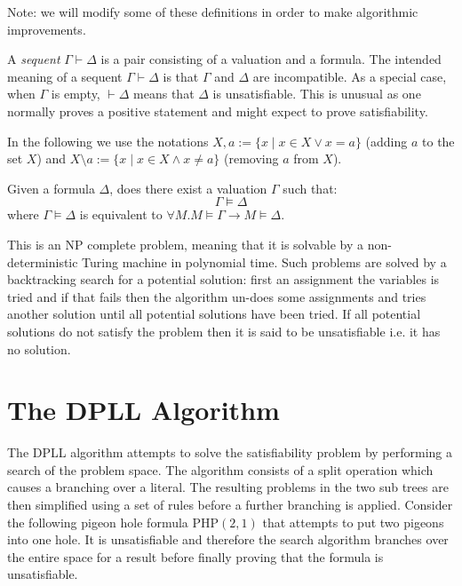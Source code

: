 \begin{mydef}[Preliminaries]
Note: we will modify some of these definitions in order to make algorithmic improvements.
\end{mydef}

%
A \emph{sequent} $\Gamma \vdash \Delta$ is a pair consisting of a valuation and a formula.
%
The intended meaning of a sequent $\Gamma \vdash \Delta$ is that $\Gamma$ and $\Delta$
are incompatible. As a special case, when $\Gamma$ is empty, $\vdash \Delta$ means that $\Delta$ is unsatisfiable. This is unusual as one normally proves a positive statement and might expect to prove satisfiability.
\begin{comment}
\begin{defi}
We define an equivalence relation $\sim$ over the formulae $\Delta_1$ and $\Delta_2$ as follows
$$\Delta_1 \sim \Delta_2 \leftrightarrow \forall C .( C \in \Delta_1 \leftrightarrow C \in \Delta_2) $$
\end{defi}
\end{comment}
%
In the following we use the notations $X,a := \{x \mid x\in X \lor x = a\}$ 
(adding $a$ to the set $X$) and 
$X\setminus a := \{x \mid x\in X \land x \neq a\}$ (removing $a$ from $X$).
%
\medskip
\begin{mydef}
Given a formula $\Delta$, does there exist a valuation $\Gamma$ such that:
$$\Gamma \models \Delta$$
where $\Gamma \models \Delta$ is equivalent to $\forall M. M \models \Gamma \to M \models \Delta$.
\end{mydef}
This is an NP complete problem, meaning that it is solvable by a non-deterministic Turing machine in polynomial time. Such problems are solved by a backtracking search for a potential solution: first an  assignment the variables is tried and if that fails then the algorithm un-does some assignments and tries another solution until all potential solutions have been tried. If all potential solutions do not satisfy the problem then it is said to be unsatisfiable i.e. it has no solution.
\section{The DPLL Algorithm}
The DPLL algorithm attempts to solve the satisfiability problem by performing a search of the problem space. The algorithm consists of a split operation which causes a branching over a literal. The resulting problems in the two sub trees are then simplified using a set of rules before a further branching is applied. Consider the following pigeon hole formula $\mathrm{PHP}(2,1)$ that attempts to put two pigeons into one hole. It is unsatisfiable and therefore the search algorithm branches over the entire space for a result before finally proving that the formula is unsatisfiable.

